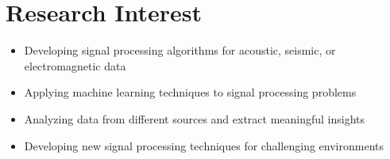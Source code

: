 \documentclass{my_cv}%
\begin{document}
\section{Research Interest}
\vspace{1em}
\begin{itemize}[leftmargin=0.15in]
\setlength\itemsep{-0.1em}
\color{mygray}
\item Developing signal processing algorithms for acoustic, seismic, or electromagnetic data
\item Applying machine learning techniques to signal processing problems
\item Analyzing data from different sources and extract meaningful insights
\item Developing new signal processing techniques for challenging environments

\end{itemize}
\end{document}
